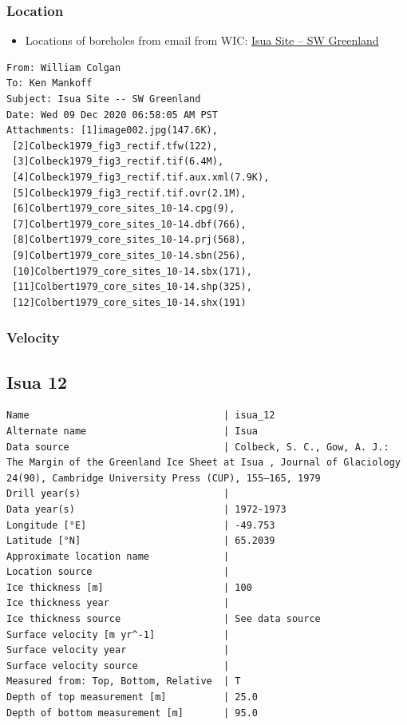 \documentclass[article,a4paper,times,11pt,twoside]{article}
\begin{document}
\subsubsection{Location}
\label{sec:org76a3e85}

\begin{itemize}
\item Locations of boreholes from email from WIC: \href{msgid:AM0PR04MB6129F131ECD9123E72752945A2CC0@AM0PR04MB6129.eurprd04.prod.outlook.com}{Isua Site -- SW Greenland}
\end{itemize}

\begin{verbatim}
From: William Colgan
To: Ken Mankoff
Subject: Isua Site -- SW Greenland
Date: Wed 09 Dec 2020 06:58:05 AM PST
Attachments: [1]image002.jpg(147.6K),
 [2]Colbeck1979_fig3_rectif.tfw(122),
 [3]Colbeck1979_fig3_rectif.tif(6.4M),
 [4]Colbeck1979_fig3_rectif.tif.aux.xml(7.9K),
 [5]Colbeck1979_fig3_rectif.tif.ovr(2.1M),
 [6]Colbert1979_core_sites_10-14.cpg(9),
 [7]Colbert1979_core_sites_10-14.dbf(766),
 [8]Colbert1979_core_sites_10-14.prj(568),
 [9]Colbert1979_core_sites_10-14.sbn(256),
 [10]Colbert1979_core_sites_10-14.sbx(171),
 [11]Colbert1979_core_sites_10-14.shp(325),
 [12]Colbert1979_core_sites_10-14.shx(191)
\end{verbatim}

\subsubsection{Velocity}
\label{sec:orgb027026}
\clearpage
\subsection{Isua 12}
\label{sec:orge399c59}
\begin{verbatim}
Name                                  | isua_12
Alternate name                        | Isua
Data source                           | Colbeck, S. C., Gow, A. J.: The Margin of the Greenland Ice Sheet at Isua , Journal of Glaciology 24(90), Cambridge University Press (CUP), 155–165, 1979 
Drill year(s)                         | 
Data year(s)                          | 1972-1973
Longitude [°E]                        | -49.753
Latitude [°N]                         | 65.2039
Approximate location name             | 
Location source                       | 
Ice thickness [m]                     | 100
Ice thickness year                    | 
Ice thickness source                  | See data source
Surface velocity [m yr^-1]            | 
Surface velocity year                 | 
Surface velocity source               | 
Measured from: Top, Bottom, Relative  | T
Depth of top measurement [m]          | 25.0
Depth of bottom measurement [m]       | 95.0
\end{verbatim}
\end{document}
